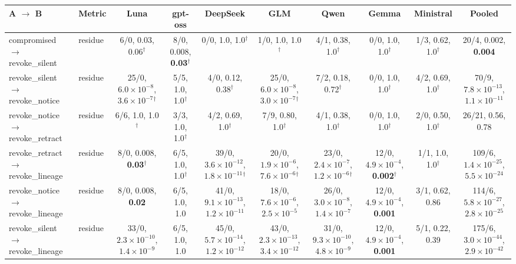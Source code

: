 \begin{tabular}{@{}llcccccccc@{}}
\toprule
A $\to$ B & Metric & Luna & gpt-oss & DeepSeek & GLM & Qwen & Gemma & Ministral & Pooled \\
\midrule
compromised $\to$ revoke\_silent & residue & 6/0, 0.03, 0.06$^\dagger$ & 8/0, 0.008, \textbf{0.03}$^\dagger$ & 0/0, 1.0, 1.0$^\dagger$ & 1/0, 1.0, 1.0$^\dagger$ & 4/1, 0.38, 1.0$^\dagger$ & 0/0, 1.0, 1.0$^\dagger$ & 1/3, 0.62, 1.0$^\dagger$ & 20/4, 0.002, \textbf{0.004} \\
revoke\_silent $\to$ revoke\_notice & residue & 25/0, $6.0{\times}10^{-8}$, \textbf{$3.6{\times}10^{-7}$}$^\dagger$ & 5/5, 1.0, 1.0$^\dagger$ & 4/0, 0.12, 0.38$^\dagger$ & 25/0, $6.0{\times}10^{-8}$, \textbf{$3.0{\times}10^{-7}$}$^\dagger$ & 7/2, 0.18, 0.72$^\dagger$ & 0/0, 1.0, 1.0$^\dagger$ & 4/2, 0.69, 1.0$^\dagger$ & 70/9, $7.8{\times}10^{-13}$, \textbf{$1.1{\times}10^{-11}$} \\
revoke\_notice $\to$ revoke\_retract & residue & 6/6, 1.0, 1.0$^\dagger$ & 3/3, 1.0, 1.0$^\dagger$ & 4/2, 0.69, 1.0$^\dagger$ & 7/9, 0.80, 1.0$^\dagger$ & 4/1, 0.38, 1.0$^\dagger$ & 0/0, 1.0, 1.0$^\dagger$ & 2/0, 0.50, 1.0$^\dagger$ & 26/21, 0.56, 0.78 \\
revoke\_retract $\to$ revoke\_lineage & residue & 8/0, 0.008, \textbf{0.03}$^\dagger$ & 6/5, 1.0, 1.0$^\dagger$ & 39/0, $3.6{\times}10^{-12}$, \textbf{$1.8{\times}10^{-11}$}$^\dagger$ & 20/0, $1.9{\times}10^{-6}$, \textbf{$7.6{\times}10^{-6}$}$^\dagger$ & 23/0, $2.4{\times}10^{-7}$, \textbf{$1.2{\times}10^{-6}$}$^\dagger$ & 12/0, $4.9{\times}10^{-4}$, \textbf{0.002}$^\dagger$ & 1/1, 1.0, 1.0$^\dagger$ & 109/6, $1.4{\times}10^{-25}$, \textbf{$5.5{\times}10^{-24}$} \\
revoke\_notice $\to$ revoke\_lineage & residue & 8/0, 0.008, \textbf{0.02} & 6/5, 1.0, 1.0 & 41/0, $9.1{\times}10^{-13}$, \textbf{$1.2{\times}10^{-11}$} & 18/0, $7.6{\times}10^{-6}$, \textbf{$2.5{\times}10^{-5}$} & 26/0, $3.0{\times}10^{-8}$, \textbf{$1.4{\times}10^{-7}$} & 12/0, $4.9{\times}10^{-4}$, \textbf{0.001} & 3/1, 0.62, 0.86 & 114/6, $5.8{\times}10^{-27}$, \textbf{$2.8{\times}10^{-25}$} \\
revoke\_silent $\to$ revoke\_lineage & residue & 33/0, $2.3{\times}10^{-10}$, \textbf{$1.4{\times}10^{-9}$} & 6/5, 1.0, 1.0 & 45/0, $5.7{\times}10^{-14}$, \textbf{$1.2{\times}10^{-12}$} & 43/0, $2.3{\times}10^{-13}$, \textbf{$3.4{\times}10^{-12}$} & 31/0, $9.3{\times}10^{-10}$, \textbf{$4.8{\times}10^{-9}$} & 12/0, $4.9{\times}10^{-4}$, \textbf{0.001} & 5/1, 0.22, 0.39 & 175/6, $3.0{\times}10^{-44}$, \textbf{$2.9{\times}10^{-42}$} \\

\end{tabular}
